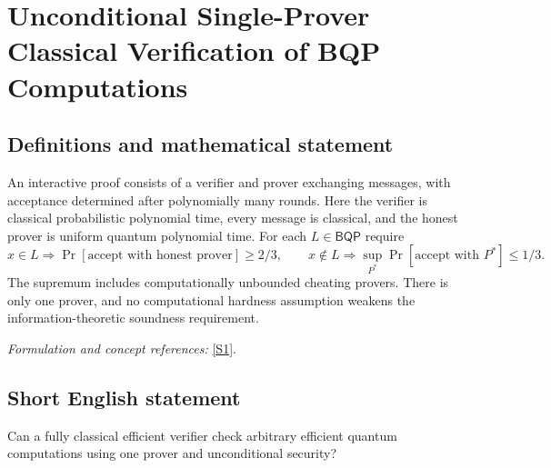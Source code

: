 \documentclass[11pt,a4paper]{article}
\newcommand{\sref}[2]{\hyperlink{source:#1:#2}{[S#2]}}
\newif\ifshowcatalogue
\newcommand{\cataloguescope}[1]{\ifshowcatalogue
 \paragraph{Exact scope in the supplied catalogue.}
 \begin{quote}\small #1\end{quote}\fi}
\numberwithin{equation}{section}
\begin{document}
\setcounter{section}{128}
\setlength{\parskip}{3pt plus 1pt}
\clearpage
\section{\texorpdfstring{Unconditional Single-Prover Classical Verification of BQP Computations}{Unconditional Single-Prover Classical Verification of BQP Computations}}\label{129}
\subsection{Definitions and mathematical statement}
An interactive proof consists of a verifier and prover exchanging messages, with acceptance determined after polynomially many rounds. Here the verifier is classical probabilistic polynomial time, every message is classical, and the honest prover is uniform quantum polynomial time. For each $L\in\mathsf{BQP}$ require
\[
 x\in L\Rightarrow\Pr[\text{accept with honest prover}]\ge2/3,\qquad
 x\notin L\Rightarrow\sup_{P^*}\Pr[\text{accept with }P^*]\le1/3.
\]
The supremum includes computationally unbounded cheating provers. There is only one prover, and no computational hardness assumption weakens the information-theoretic soundness requirement.
\par\smallskip\textit{Formulation and concept references:} \sref{129}{1}.
\cataloguescope{Determine whether every language L in BQP admits a polynomial-round interactive proof with only classical messages between a probabilistic classical polynomial-time verifier and a single honest uniform quantum polynomial-time prover, with completeness at least 2/3 and soundness at most 1/3 against every computationally unbounded cheating prover.}
\subsection{Short English statement}
Can a fully classical efficient verifier check arbitrary efficient quantum computations using one prover and unconditional security?
\end{document}
